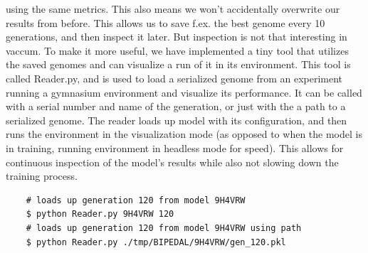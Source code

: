 \documentclass{article}
\begin{document}
    using the same metrics. This also means we won't accidentally overwrite our results from before.
    This allows us to save f.ex. the best genome every 10 generations, and then inspect it later. But inspection is not 
    that interesting in vaccum. To make it more useful, we have implemented a tiny tool that utilizes
    the saved genomes and can visualize a run of it in its environment. This tool is called Reader.py,
    and is used to load a serialized genome from an experiment running a gymnasium
    environment and visualize its performance.
    It can be called with a serial number and name of the generation,
    or just with the a path to a serialized genome. The reader loads up model with its configuration,
    and then runs the environment in the visualization mode (as opposed to when the 
    model is in training, running environment in headless mode for speed). This allows for continuous inspection of the
    model's results while also not slowing down the training process.
    \begin{verbatim}
    # loads up generation 120 from model 9H4VRW 
    $ python Reader.py 9H4VRW 120  
    # loads up generation 120 from model 9H4VRW using path
    $ python Reader.py ./tmp/BIPEDAL/9H4VRW/gen_120.pkl
    \end{verbatim}
\end{document}
